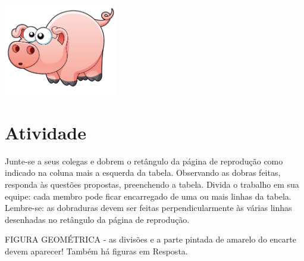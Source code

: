 \documentclass[a4,12pt]{book}
\begin{document}
\includegraphics[width=\textwidth,height=4cm, keepaspectratio]{pig}
\section{Atividade}








Junte-se a seus colegas e dobrem o retângulo da página de reprodução como indicado na coluna mais a esquerda da tabela. Observando as dobras feitas, responda às questões propostas, preenchendo a tabela. Divida o trabalho em sua equipe: cada membro pode ficar encarregado de uma ou mais linhas da tabela. Lembre-se: as dobraduras devem ser feitas perpendicularmente às várias linhas desenhadas no retângulo da página de reprodução.
\begin{imagem*}[breakable]{}{}   FIGURA GEOMÉTRICA - as divisões e a parte pintada de amarelo do encarte devem aparecer! Também há figuras em Resposta. \end{imagem*}
\end{document}
